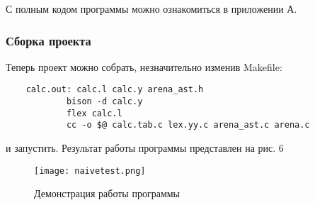 С полным кодом программы можно ознакомиться в приложении А.

\subsubsection{ Сборка проекта}
Теперь проект можно собрать, незначительно изменив Makefile:

\begin{verbatim}
    calc.out: calc.l calc.y arena_ast.h
            bison -d calc.y
            flex calc.l
            cc -o $@ calc.tab.c lex.yy.c arena_ast.c arena.c
\end{verbatim}
и запустить. Результат работы программы представлен на рис. 6
\begin{figure}[h!]
    \centering
    \texttt{[image: naivetest.png]}
    \caption{Демонстрация работы программы}
    \label{fig:six}
\end{figure}
